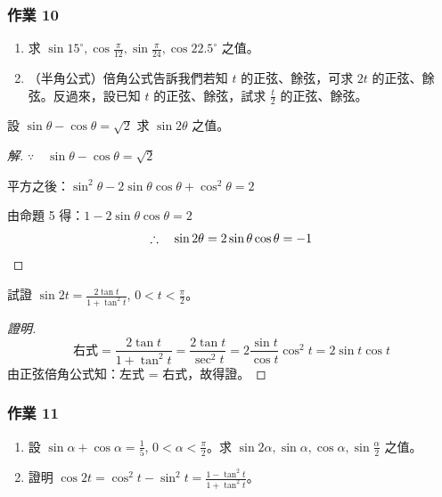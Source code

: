 \subsubsection*{作業 10}
\begin{enumerate}[label=\roman*), leftmargin=2.5em]
  \item 求 $\sin 15^\circ, \cos\frac{\pi}{12}, \sin\frac{\pi}{24}, \cos 22.5^\circ$ 之值。
  \item（半角公式）倍角公式告訴我們若知 $t$ 的正弦、餘弦，可求 $2t$ 的正弦、餘弦。反過來，設已知 $t$ 的正弦、餘弦，試求 $\frac{t}{2}$ 的正弦、餘弦。
\end{enumerate}

\begin{example}
設 $\sin\theta - \cos\theta = \sqrt{2}$ 求 $\sin 2\theta$ 之值。
\end{example}

\begin{proof}[解]
$\because\quad \sin\theta - \cos\theta = \sqrt{2}$

平方之後：$\sin^2\theta - 2\sin\theta\cos\theta + \cos^2\theta = 2$

由命題 5 得：$1 - 2\sin\theta\cos\theta = 2$
\[ \therefore\quad \sin 2\theta = 2\sin\theta\cos\theta = -1 \qedhere \]
\end{proof}

\begin{example}
試證 $\sin 2t = \frac{2\tan t}{1 + \tan^2 t}$, $0 < t < \frac{\pi}{2}$。
\end{example}

\begin{proof}[證明]
\[ \text{右式} = \frac{2\tan t}{1 + \tan^2 t} = \frac{2\tan t}{\sec^2 t} = 2\frac{\sin t}{\cos t}\cos^2 t = 2\sin t\cos t \]
由正弦倍角公式知：左式 = 右式，故得證。
\end{proof}

\subsubsection*{作業 11}
\begin{enumerate}[label=\roman*), leftmargin=2.5em]
  \item 設 $\sin\alpha + \cos\alpha = \frac{1}{5}$, $0 < \alpha < \frac{\pi}{2}$。求 $\sin 2\alpha, \sin\alpha, \cos\alpha, \sin\frac{\alpha}{2}$ 之值。
  \item 證明 $\cos 2t = \cos^2 t - \sin^2 t = \frac{1 - \tan^2 t}{1 + \tan^2 t}$。
\end{enumerate}

